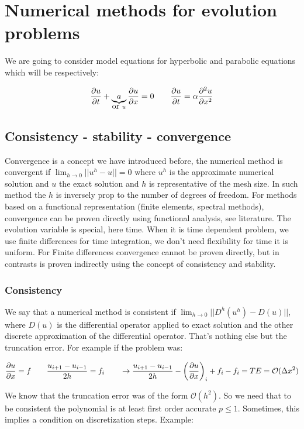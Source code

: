 \chapter{Numerical methods for evolution problems}
We are going to consider model equations for hyperbolic and parabolic equations which will be respectively: 

\begin{equation}
\frac{\partial u}{\partial t} + \underbrace{a}_{\mbox{or } u} \frac{\partial u}{\partial x} = 0 \qquad \frac{\partial u }{\partial t} = \alpha \frac{\partial ^2u}{\partial x^2}
\end{equation}

\section{Consistency - stability - convergence}
Convergence is a concept we have introduced before, the numerical method is convergent if $\lim _{h\rightarrow 0} || u^h - u|| = 0$ where $u^h$ is the approximate numerical solution and $u$ the exact solution and $h$ is representative of the mesh size. In such method the $h$ is inversely prop to the number of degrees of freedom. For methods based on a functional representation (finite elements, spectral methods), convergence can be proven directly using functional analysis, see literature. The evolution variable is special, here time. When it is time dependent problem, we use finite differences for time integration, we don't need flexibility for time it is uniform. For Finite differences convergence cannot be proven directly, but in contrasts is proven indirectly using the concept of consistency and stability. 

\subsection{Consistency}
We say that a numerical method is consistent if $\lim _{h\rightarrow 0} ||D^h(u^h) - D(u)||$, where $D(u)$ is the differential operator applied to exact solution and the other discrete approximation of the differential operator. That's nothing else but the truncation error.  For example if the problem was: 

\begin{equation}
\frac{\partial u}{\partial x} = f \qquad \frac{u_{i+1}-u_{i-1}}{2h} = f_i \qquad
 \rightarrow \frac{u_{i+1}-u_{i-1}}{2h} - \left( \frac{\partial u}{\partial x}\right) _i + f_i - f_i = TE = \mathcal{O}(\Delta x^2)
\end{equation}

We know that the truncation error was of the form $\mathcal{O}(h^2)$. So we need that to be consistent the polynomial is at least first order accurate $p\leq 1$. Sometimes, this implies a condition on discretization steps. Example: 

